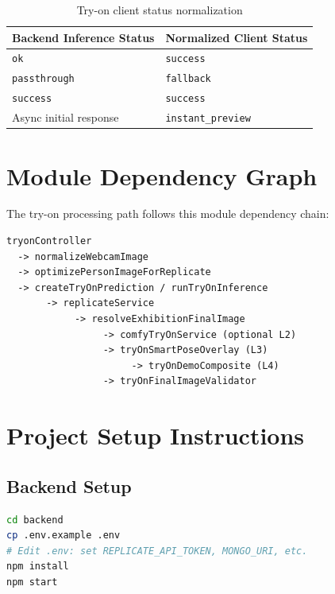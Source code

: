 \begin{table}[H]
  \centering
  \caption{Try-on client status normalization}
  \label{tab:status-mapping}
  \begin{tabular}{@{}ll@{}}
    \toprule
    \textbf{Backend Inference Status} & \textbf{Normalized Client Status} \\
    \midrule
    \texttt{ok} & \texttt{success} \\
    \texttt{passthrough} & \texttt{fallback} \\
    \texttt{success} & \texttt{success} \\
    Async initial response & \texttt{instant\_preview} \\
    \bottomrule
  \end{tabular}
\end{table}

\section{Module Dependency Graph}
\label{app:module-graph}

The try-on processing path follows this module dependency chain:

\begin{lstlisting}[language={}, caption={Try-on module dependency graph}]
tryonController
  -> normalizeWebcamImage
  -> optimizePersonImageForReplicate
  -> createTryOnPrediction / runTryOnInference
       -> replicateService
            -> resolveExhibitionFinalImage
                 -> comfyTryOnService (optional L2)
                 -> tryOnSmartPoseOverlay (L3)
                      -> tryOnDemoComposite (L4)
                 -> tryOnFinalImageValidator
\end{lstlisting}

\section{Project Setup Instructions}
\label{app:setup}

\subsection{Backend Setup}

\begin{lstlisting}[language=bash, caption={Backend installation and startup}]
cd backend
cp .env.example .env
# Edit .env: set REPLICATE_API_TOKEN, MONGO_URI, etc.
npm install
npm start
\end{lstlisting}


